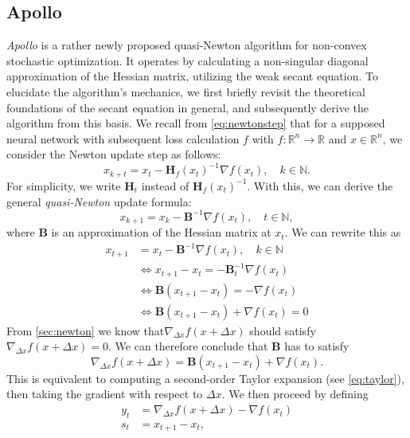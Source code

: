 \subsection{Apollo}
\label{sec:apollo}
\emph{Apollo} \cite{apollo} is a rather newly proposed quasi-Newton algorithm for non-convex stochastic
optimization. It operates by calculating a non-singular diagonal approximation  of the Hessian matrix,
utilizing the weak secant equation. To elucidate the algorithm's mechanics, we first briefly
revisit the theoretical foundations of the secant equation in general, and subsequently derive
the algorithm from this basis. We recall from \ref{eq:newtonstep} that for a supposed neural network with subsequent
loss calculation $f$ with $f: \mathbb{R}^n \to \mathbb{R}$ and $x \in \mathbb{R}^n$, we consider the Newton update step as follows:
\begin{equation}
    x_{k+t} = x_t - \mathbf{H}_f(x_t)^{-1} \nabla f(x_t), \quad k \in \mathbb{N}.
\end{equation}
For simplicity, we write $\mathbf{H}_t$ instead of $\mathbf{H}_f(x_t)^{-1}$. With this, we can derive the general \emph{quasi-Newton} update formula:
\begin{equation}
    x_{k+1} = x_k - \mathbf{B}^{-1} \nabla f(x_t), \quad t \in \mathbb{N},
\end{equation}
where $\mathbf{B}$ is an approximation of the Hessian matrix at $x_t$.
We can rewrite this as
\begin{align}
    x_{t+1} &= x_t - \mathbf{B}^{-1} \nabla f(x_t), \quad k \in \mathbb{N} \nonumber \\
    &\Longleftrightarrow x_{t+1} - x_t = - \mathbf{B}_t^{-1} \nabla f(x_t) \nonumber \\
    &\Longleftrightarrow \mathbf{B}(x_{t+1} - x_t) = - \nabla f(x_t) \nonumber \\
    &\Longleftrightarrow \mathbf{B}(x_{t+1} - x_t) + \nabla f(x_t) = 0
\end{align}
From \ref{sec:newton} we know that$\nabla_{\Delta x} f(x+\Delta x)$ should satisfy $\nabla_{\Delta x} f(x+\Delta x) = 0$. We can therefore 
conclude that $\mathbf{B}$ has to satisfy
\begin{equation}
    \nabla_{\Delta x} f(x+\Delta x) = \mathbf{B}(x_{t+1} - x_t) + \nabla f(x_t).
\end{equation}
This is equivalent to computing a second-order Taylor expansion (see \ref{eq:taylor}), then taking the gradient with respect to $\Delta x$.
We then proceed by defining
\begin{align}
    y_t &= \nabla_{\Delta x} f(x+\Delta x) -  \nabla f(x_t) \\
    s_t &= x_{t+1} - x_t,
\end{align}

